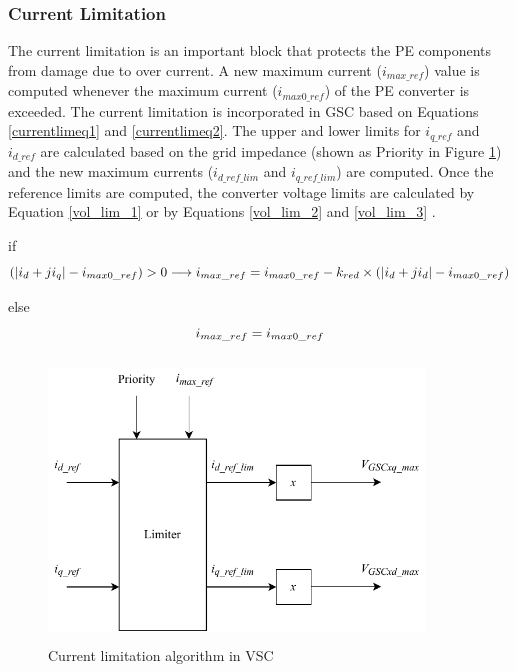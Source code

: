 \subsubsection{Current Limitation}\label{currentlimitation_RSCAD}
The current limitation is an important block that protects the \gls{PE} components from damage due to over current. A new maximum current ($i_{max\_ref}$) value is computed whenever the maximum current ($i_{max0\_ref}$) of the \gls{PE} converter is exceeded. The current limitation is incorporated in \gls{GSC} based on Equations \ref{currentlimeq1} and \ref{currentlimeq2}. The upper and lower limits for $i_{q\_ref}$ and $i_{d\_ref}$ are calculated based on the grid impedance (shown as Priority in Figure \ref{fig:Current_Limiter_block}) and the new maximum currents ($i_{d\_ref\_lim}$ and $i_{q\_ref\_lim}$) are computed. 
Once the reference limits are computed, the converter voltage limits are calculated by Equation \ref{vol_lim_1} or by Equations \ref{vol_lim_2} and \ref{vol_lim_3} \cite{korai_dynamic_2019}.

if
\begin{equation} \label{currentlimeq1}
  (|i_d+ji_q|-i_{max0\_ref})>0 \longrightarrow i_{max\_ref} = i_{max0\_ref} - k_{red} \times (|i_d+ji_d|-i_{max0\_ref}) \\
\end{equation}

else
\begin{equation}\label{currentlimeq2}
    \\
  i_{max\_ref} = i_{max0\_ref}  
 \end{equation}
 
\begin{figure}[H]
\centering
    \includegraphics[height = 7.5cm,width = 10cm]{Diagrams/Chapter_3/Current_Limiter_block.pdf}
    \caption{Current limitation algorithm in VSC \cite{korai_dynamic_2019}}
    \label{fig:Current_Limiter_block}
\end{figure}


